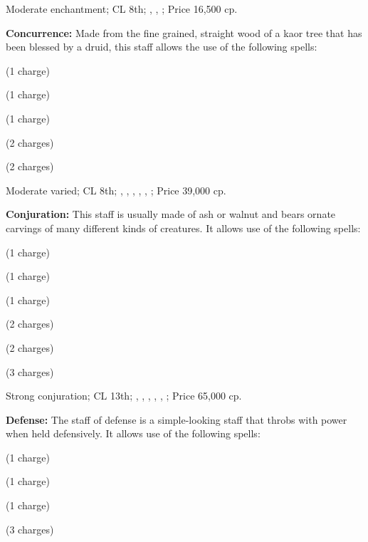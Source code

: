Moderate enchantment; CL 8th; , , ; Price 16,500 cp.

\textbf{Concurrence:} Made from the fine grained, straight wood of a kaor tree that has been blessed by a druid, this staff allows the use of the following spells:
\begin{itemize*}
\item {} (1 charge)
\item {} (1 charge)
\item {} (1 charge)
\item {} (2 charges)
\item {} (2 charges)
\end{itemize*}

Moderate varied; CL 8th; , , , , , ; Price 39,000 cp.

\textbf{Conjuration:} This staff is usually made of ash or walnut and bears ornate carvings of many different kinds of creatures. It allows use of the following spells:
\begin{itemize*}
\item {} (1 charge)
\item {} (1 charge)
\item {} (1 charge)
\item {} (2 charges)
\item {} (2 charges)
\item {} (3 charges)
\end{itemize*}

Strong conjuration; CL 13th; , , , , , ; Price 65,000 cp.

\textbf{Defense:} The staff of defense is a simple-looking staff that throbs with power when held defensively. It allows use of the following spells:
\begin{itemize*}
\item {} (1 charge)
\item {} (1 charge)
\item {} (1 charge)
\item {} (3 charges)
\end{itemize*}

